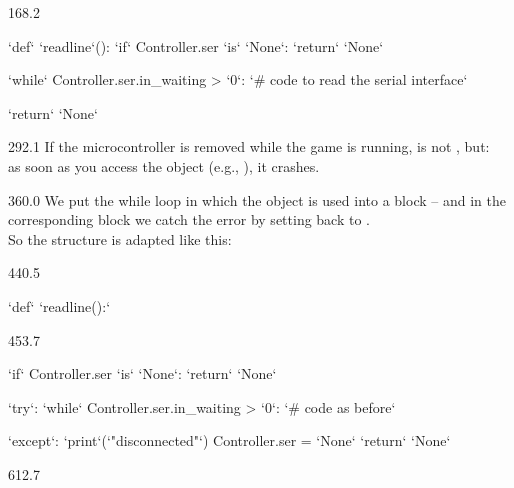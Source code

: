 \documentclass{aslab}
\newcommand*\Kw[1]{\textcolor{codeorange}{#1}}  %
\newcommand*\Cy[1]{\textcolor{codecyan}{#1}}    %
\newcommand*\Nu[1]{\textcolor{codered}{#1}}     %
\newcommand*\Cm[1]{\textcolor{codepurple}{#1}}  %
\newcommand*\Bl[1]{\textcolor{aslabblue}{#1}}   %
\begin{document}
\begin{region}[pitch=12]{168.2}
\begin{codeblock}[escapechar=`]
`\Kw{def}` `\Cy{readline}`():
    `\Kw{if}` Controller.ser `\Kw{is}` `\Cy{None}`:
        `\Kw{return}` `\Cy{None}`

    `\Kw{while}` Controller.ser.in_waiting > `\Nu{0}`:
        `\Cm{\# code to read the serial interface}`

    `\Kw{return}` `\Cy{None}`
\end{codeblock}
\end{region}

\begin{region}[pitch=13.53]{292.1}
If the microcontroller is removed while the game is running,
 is not , but:\\
as soon as you access the object (e.g., ), it
crashes.
\end{region}

\begin{region}[pitch=13.47]{360.0}
We put the while loop in which the object is used into a  block --
and in the corresponding  block we catch the error by setting
 back to .\\
So the structure is adapted like this:
\end{region}

\begin{region}{440.5}
\begin{codeblock}[escapechar=`]
`\Kw{def}` `\Cy{readline}\Bl{():}`
\end{codeblock}
\end{region}

\begin{region}[pitch=12]{453.7}
\begin{codeblock}[escapechar=`]
    `\Kw{if}` Controller.ser `\Kw{is}` `\Cy{None}`:
        `\Kw{return}` `\Cy{None}`

    `\Kw{try}`:
        `\Kw{while}` Controller.ser.in_waiting > `\Nu{0}`:
            `\Cm{\# code as before}`

    `\Kw{except}`:
        `\Cy{print}`(`\Nu{"disconnected"}`)
        Controller.ser = `\Cy{None}`
    `\Kw{return}` `\Cy{None}`
\end{codeblock}
\end{region}

\begin{region}{612.7}
\end{region}
\end{document}
